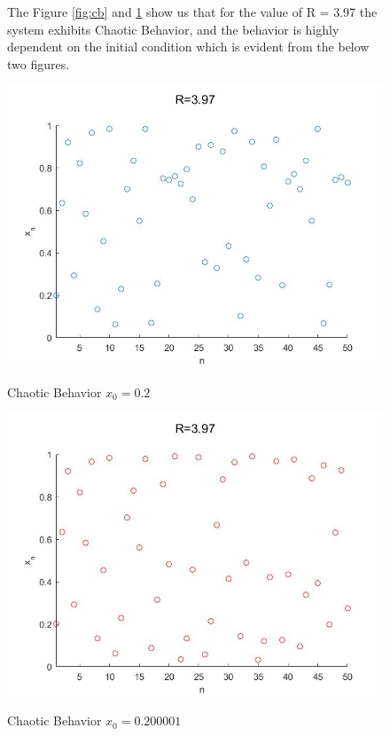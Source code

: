 \documentclass[11pt,a4paper]{article}
\begin{document}
\begin{figure}[H]
{
The Figure \ref{fig:cb} and \ref{fig:cb1} show us that for the value of R = 3.97 the system exhibits Chaotic Behavior, and the behavior is highly dependent on the initial condition which is evident from the below two figures. \par\bigskip
\centering
\includegraphics[scale=0.5]{images/chaotic.jpg}
\caption{Chaotic Behavior $x_{0}=0.2$}\par\medskip
\label{fig:cb}
\includegraphics[scale=0.5]{images/chaotic1.jpg}
\caption{Chaotic Behavior $x_{0}=0.200001$}\par\medskip
\label{fig:cb1}
}
\end{figure}
\end{document}
